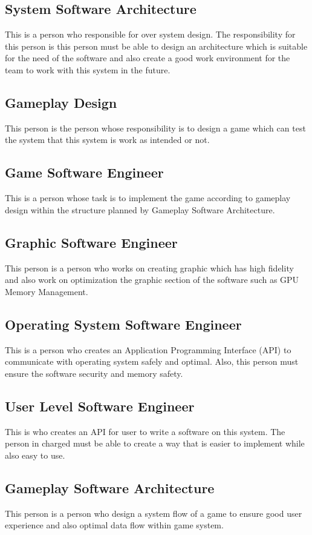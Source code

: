 \begin{multicols}{2}
\subsection*{System Software Architecture}
This is a person who responsible for over system design.
The responsibility for this person is this person must be able to design an architecture which is
suitable for the need of the software and also create a good work environment for the team to work
with this system in the future.

\subsection*{Gameplay Design}
This person is the person whose responsibility is to design a game which can test the system
that this system is work as intended or not.

\subsection*{Game Software Engineer}
This is a person whose task is to implement the game according to gameplay design within the
structure planned by Gameplay Software Architecture.

\subsection*{Graphic Software Engineer}
This person is a person who works on creating graphic which has high fidelity and also work
on optimization the graphic section of the software such as GPU Memory Management.

\subsection*{Operating System Software Engineer}
This is a person who creates an Application Programming Interface (API) to communicate with
operating system safely and optimal.
Also, this person must ensure the software security and memory safety.

\subsection*{User Level Software Engineer}
This is who creates an API for user to write a software on this system.
The person in charged must be able to create a way that is easier to implement while
also easy to use.

\subsection*{Gameplay Software Architecture}
This person is a person who design a system flow of a game to ensure good user experience
and also optimal data flow within game system.


\end{multicols}
